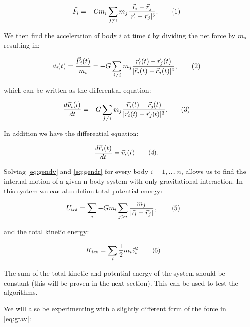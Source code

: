 \documentclass[reprint,english,notitlepage]{revtex4-1}  %
\newcommand\numberthis{\addtocounter{equation}{1}\tag{\theequation}}
\begin{document}
\begin{align*}
	\vec{F}_{i} = -Gm_{i}\sum_{j\neq i}m_{j}\frac{\vec{r}_{i}-\vec{r}_{j}}{|\vec{r}_{i}-\vec{r}_{j}|^{3}}. \numberthis \label{eq:gengrav}
\end{align*}

We then find the acceleration of body \(i\) at time \(t\) by dividing the net force by \(m_{a}\) resulting in:

\begin{align*}
	\vec{a}_{i}(t) = \frac{\vec{F}_{i}(t)}{m_{i}} = -G\sum_{j\neq i}m_{j}\frac{\vec{r}_{i}(t)-\vec{r}_{j}(t)}{|\vec{r}_{i}(t)-\vec{r}_{j}(t)|^{3}}, \numberthis \label{eq:accel}
\end{align*}

which can be written as the differential equation:

\begin{align*}
 	\frac{d\vec{v}_{i}(t)}{dt} = -G\sum_{j\neq i}m_{j}\frac{\vec{r}_{i}(t)-\vec{r}_{j}(t)}{|\vec{r}_{i}(t)-\vec{r}_{j}(t)|^{3}}. \numberthis \label{eq:gendv}
\end{align*}

In addition we have the differential equation:

\begin{align*}
	\frac{d\vec{r}_{i}(t)}{dt} = \vec{v}_{i}(t) \numberthis \label{eq:gendr}.
\end{align*}

Solving \eqref{eq:gendv} and \eqref{eq:gendr} for every body \(i=1, ..., n\), allows us to find the internal motion of a given n-body system with only gravitational interaction. In this system we can also define total potential energy:

\begin{align*}
U_\text{tot} &= \sum\limits_i - G m_i \sum\limits_{j > i} \frac{m_j}{|\vec{r}_i - \vec{r}_j|} \, , \numberthis \label{eq:tot_pot_en}
\end{align*}

and the total kinetic energy:

\begin{align*}
K_\text{tot} &= \sum\limits_i \frac{1}{2}m_i \vec{v}_i^2 \numberthis \label{eq:tot_kin_en}
\end{align*}

The sum of the total kinetic and potential energy of the system should be constant (this will be proven in the next section). This can be used to test the algorithms.

We will also be experimenting with a slightly different form of the force in \eqref{eq:grav}:
\end{document}
